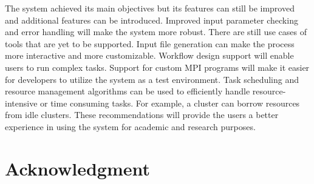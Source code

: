 The system achieved its main objectives but its features can still be improved and additional features can be introduced. Improved input parameter checking and error handling will make the system more robust. There are still use cases of tools that are yet to be supported. Input file generation can make the process more interactive and more customizable.  Workflow design support will enable users to run complex tasks. Support for custom MPI programs will make it easier for developers to utilize the system as a test environment. Task scheduling and resource management algorithms can be used to efficiently handle resource-intensive or time consuming tasks. For example, a cluster can borrow resources from idle clusters. These recommendations will provide the users a better experience in using the system for academic and research purposes. 




\section*{Acknowledgment}





